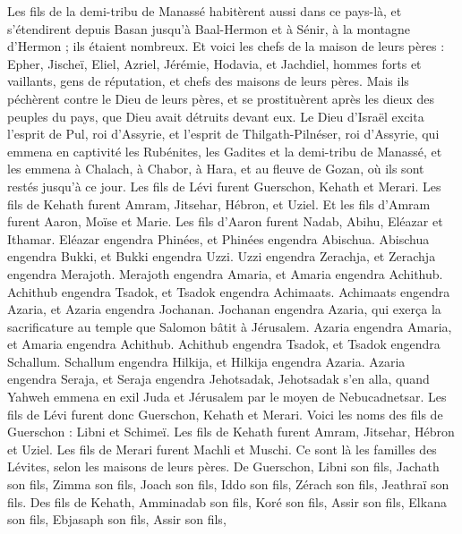 \begin{multicols}{2}
Les fils de la demi-tribu de Manassé habitèrent aussi dans ce pays-là, et s'étendirent depuis Basan jusqu'à Baal-Hermon et à Sénir, à la montagne d'Hermon ; ils étaient nombreux.
Et voici les chefs de la maison de leurs pères : Epher, Jischeï, Eliel, Azriel, Jérémie, Hodavia, et Jachdiel, hommes forts et vaillants, gens de réputation, et chefs des maisons de leurs pères.
Mais ils péchèrent contre le Dieu de leurs pères, et se prostituèrent après les dieux des peuples du pays, que Dieu avait détruits devant eux.
Le Dieu d'Israël excita l'esprit de Pul, roi d'Assyrie, et l'esprit de Thilgath-Pilnéser, roi d'Assyrie, qui emmena en captivité les Rubénites, les Gadites et la demi-tribu de Manassé, et les emmena à Chalach, à Chabor, à Hara, et au fleuve de Gozan, où ils sont restés jusqu'à ce jour.
\VerseOne{}Les fils de Lévi furent Guerschon, Kehath et Merari.
Les fils de Kehath furent Amram, Jitsehar, Hébron, et Uziel.
Et les fils d'Amram furent Aaron, Moïse et Marie. Les fils d'Aaron furent Nadab, Abihu, Eléazar et Ithamar.
Eléazar engendra Phinées, et Phinées engendra Abischua.
Abischua engendra Bukki, et Bukki engendra Uzzi.
Uzzi engendra Zerachja, et Zerachja engendra Merajoth.
Merajoth engendra Amaria, et Amaria engendra Achithub.
Achithub engendra Tsadok, et Tsadok engendra Achimaats.
Achimaats engendra Azaria, et Azaria engendra Jochanan.
Jochanan engendra Azaria, qui exerça la sacrificature au temple que Salomon bâtit à Jérusalem.
Azaria engendra Amaria, et Amaria engendra Achithub.
Achithub engendra Tsadok, et Tsadok engendra Schallum.
Schallum engendra Hilkija, et Hilkija engendra Azaria.
Azaria engendra Seraja, et Seraja engendra Jehotsadak,
Jehotsadak s'en alla, quand Yahweh emmena en exil Juda et Jérusalem par le moyen de Nebucadnetsar.
Les fils de Lévi furent donc Guerschon, Kehath et Merari.
Voici les noms des fils de Guerschon : Libni et Schimeï.
Les fils de Kehath furent Amram, Jitsehar, Hébron et Uziel.
Les fils de Merari furent Machli et Muschi. Ce sont là les familles des Lévites, selon les maisons de leurs pères.
De Guerschon, Libni son fils, Jachath son fils, Zimma son fils,
Joach son fils, Iddo son fils, Zérach son fils, Jeathraï son fils.
Des fils de Kehath, Amminadab son fils, Koré son fils, Assir son fils,
Elkana son fils, Ebjasaph son fils, Assir son fils,

\end{multicols}
